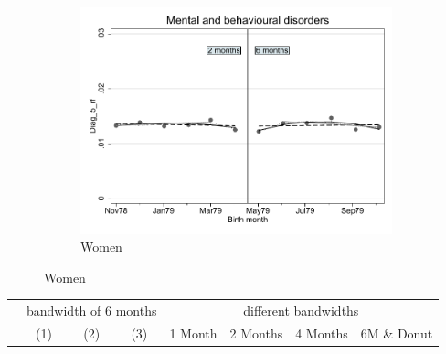\documentclass[a4paper ]{article}
\begin{document}
\begin{figure}[h]
\begin{subfigure}[t]{0.31\textwidth}
		\centering
		\includegraphics[width=0.99\textwidth]{R1_RD_Diag_5_rf_fits}
		\caption{Women}
	\end{subfigure}
\end{figure}


\begin{table}[h]\centering
\def\sym#1{\ifmmode^{#1}\else\(^{#1}\)\fi}
\begin{tabular}{l*{3}{c}|cccc}
\toprule
&\multicolumn{3}{c}{bandwidth of 6 months} & \multicolumn{4}{c}{different bandwidths} \\
 \cmidrule(lr{1em}){2-4} \cmidrule(lr{1em}){5-8}
 &\multicolumn{1}{c}{(1)}&\multicolumn{1}{c}{(2)}&\multicolumn{1}{c}{(3)}& 1 Month & 2 Months & 4 Months & 6M \& Donut \\
\midrule 

\bottomrule
\end{tabular}
\end{table}
\end{document}
